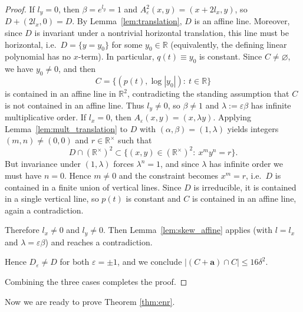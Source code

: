 \documentclass[12pt,reqno]{amsart}
\numberwithin{equation}{section}
\begin{document}
\begin{proof}
If $l_y=0$, then $\beta=e^{l_y}=1$ and $A_\varepsilon^2(x,y)=(x+2l_x,y)$, so $D+(2l_x,0)=D$.
By Lemma~\ref{lem:translation}, $D$ is an affine line. Moreover, since $D$ is invariant under a nontrivial horizontal translation, this line must be horizontal, i.e.\ $D=\{y=y_0\}$ for some $y_0\in\mathbb R$ (equivalently, the defining linear polynomial has no $x$-term).
In particular, $q(t)\equiv y_0$ is constant. Since $C\neq\varnothing$, we have $y_0\neq 0$, and then
\[
C=\{(p(t),\log|y_0|):\ t\in\mathbb R\}
\]
is contained in an affine line in $\mathbb R^2$, contradicting the standing assumption that $C$ is not contained in an affine line.
Thus $l_y\neq 0$, so $\beta\neq 1$ and $\lambda:=\varepsilon\beta$ has infinite multiplicative order.
If $l_x=0$, then $A_\varepsilon(x,y)=(x,\lambda y)$.
Applying Lemma~\ref{lem:mult_translation} to $D$ with $(\alpha,\beta)=(1,\lambda)$ yields integers $(m,n)\neq(0,0)$ and $r\in\mathbb R^\times$ such that
\[
D\cap(\mathbb R^\times)^2\subset\{(x,y)\in(\mathbb R^\times)^2:\ x^m y^n=r\}.
\]
But invariance under $(1,\lambda)$ forces $\lambda^n=1$, and since $\lambda$ has infinite order we must have $n=0$.
Hence $m\neq 0$ and the constraint becomes $x^m=r$, i.e.\ $D$ is contained in a finite union of vertical lines.
Since $D$ is irreducible, it is contained in a single vertical line, so $p(t)$ is constant and $C$ is contained in an affine line,
again a contradiction.

Therefore $l_x\neq 0$ and $l_y\neq 0$.
Then Lemma~\ref{lem:skew_affine} applies (with $l=l_x$ and $\lambda=\varepsilon\beta$) and reaches a contradiction.

Hence $D_\varepsilon\neq D$ for both $\varepsilon=\pm1$, and we conclude $|(C+\mathbf a)\cap C|\le 16\delta^2$.

\smallskip
Combining the three cases completes the proof.
\end{proof}




    
Now we are ready to prove Theorem \ref{thm:enr}.
\end{document}
